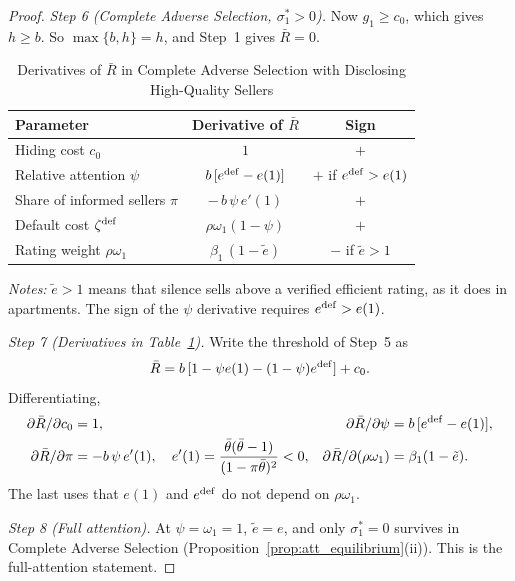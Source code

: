 \begin{proof}
\emph{Step 6 (Complete Adverse Selection, $\sigma_1^*>0$).} Now $g_1\ge c_0$, which gives $h\ge b$. So $\max\{b,h\}=h$, and Step~1 gives $\bar R=0$.

\begin{table}[htbp]
\centering
\caption{Derivatives of $\bar R$ in Complete Adverse Selection with Disclosing High-Quality Sellers}
\label{tab:threshold_cs}
\small\renewcommand{\arraystretch}{1.4}
\begin{tabular*}{\textwidth}{@{\extracolsep{\fill}}lcc@{}}
\toprule\toprule
\textbf{Parameter} & \textbf{Derivative of $\bar R$} & \textbf{Sign} \\
\midrule
Hiding cost $c_0$ & $1$ & $+$ \\
Relative attention $\psi$ & $b\,[e^{\rm def}-e(1)]$ & $+$ if $e^{\rm def}>e(1)$ \\
Share of informed sellers $\pi$ & $-\,b\,\psi\,e'(1)$ & $+$ \\
Default cost $\zeta^{\rm def}$ & $\rho\omega_1(1-\psi)$ & $+$ \\
Rating weight $\rho\omega_1$ & $\beta_1\,(1-\tilde e)$ & $-$ if $\tilde e>1$ \\
\bottomrule\bottomrule
\end{tabular*}
\vspace{0.5em}

\raggedright
\footnotesize
\textit{Notes:} $\tilde e>1$ means that silence sells above a verified efficient rating, as it does in apartments. The sign of the $\psi$ derivative requires $e^{\rm def}>e(1)$.
\end{table}

\emph{Step 7 (Derivatives in Table~\ref{tab:threshold_cs}).} Write the threshold of Step~5 as
\begin{equation*}
    \bar R=b\,[1-\psi e(1)-(1-\psi)e^{\rm def}]+c_0.
\end{equation*}
Differentiating,
\begin{align*}
    \partial\bar R/\partial c_0&=1, & \partial\bar R/\partial\psi&=b\,[e^{\rm def}-e(1)],\\
    \partial\bar R/\partial\pi&=-b\,\psi\,e'(1),\quad e'(1)=\frac{\bar\theta(\bar\theta-1)}{(1-\pi\bar\theta)^2}<0, & \partial\bar R/\partial(\rho\omega_1)&=\beta_1(1-\tilde e).
\end{align*}
The last uses that $e(1)$ and $e^{\rm def}$ do not depend on $\rho\omega_1$.

\emph{Step 8 (Full attention).} At $\psi=\omega_1=1$, $\tilde e=e$, and only $\sigma_1^*=0$ survives in Complete Adverse Selection (Proposition~\ref{prop:att_equilibrium}(ii)). This is the full-attention statement.
\end{proof}

